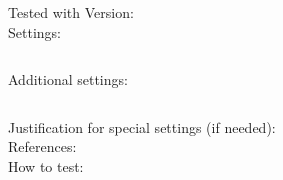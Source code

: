 \begin{description}
\item[Tested with Version:] 

\item[Settings:] \mbox{}

\begin{lstlisting}[breaklines]
    %Here goes your setting string
\end{lstlisting}

\item[Additional settings:] \mbox{}


\begin{lstlisting}[breaklines]
    %copy \& paste additional settings
\end{lstlisting}

\item[Justification for special settings (if needed):] \mbox{}


\item[References:] 


\item[How to test:]

\end{description}
